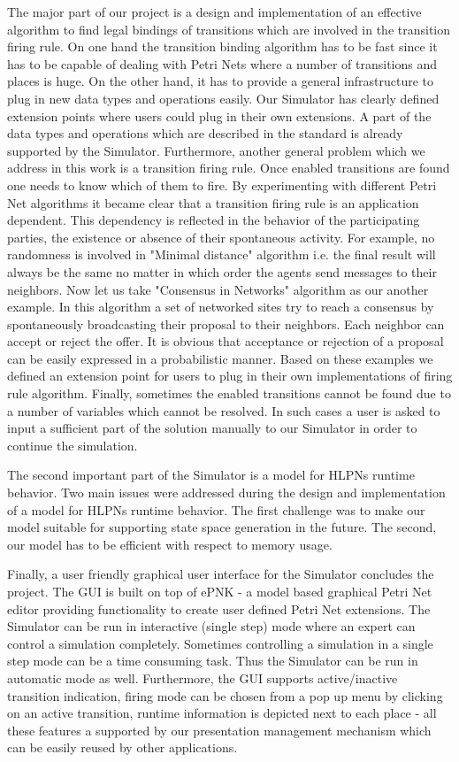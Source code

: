 The major part of our project is a design and implementation of an effective algorithm to find legal bindings of transitions which are involved in the transition firing rule. On one hand the transition binding algorithm has to be fast since it has to be capable of dealing with Petri Nets where a number of transitions and places is huge. On the other hand, it has to provide a general infrastructure to plug in new data types and operations easily. Our Simulator has clearly defined extension points where users could plug in their own extensions. A part of the data types and operations which are described in the standard is already supported by the Simulator. Furthermore, another general problem which we address in this work is a transition firing rule. Once enabled transitions are found one needs to know which of them to fire. By experimenting with different Petri Net algorithms it became clear that a transition firing rule is an application dependent. This dependency is reflected in the behavior of the participating parties, the existence or absence of their spontaneous activity. For example, no randomness is involved in "Minimal distance" algorithm \cite{min-dist} i.e. the final result will always be the same no matter in which order the agents send messages to their neighbors. Now let us take "Consensus in Networks" algorithm \cite{reisig}  as our another example. In this algorithm a set of networked sites try to reach a consensus by spontaneously broadcasting their proposal to their neighbors. Each neighbor can accept or reject the offer. It is obvious that acceptance or rejection of a proposal can be easily expressed in a probabilistic manner. Based on these examples we defined an extension point for users to plug in their own implementations of firing rule algorithm. Finally, sometimes the enabled transitions cannot be found due to a number of variables which cannot be resolved. In such cases a user is asked to input a sufficient part of the solution manually to our Simulator in order to continue the simulation.

The second important part of the Simulator is a model for HLPNs runtime behavior. Two main issues were addressed during the design and implementation of a model for HLPNs runtime behavior. The first challenge was to make our model suitable for supporting state space generation in the future. The second, our model has to be efficient with respect to memory usage.

Finally, a user friendly graphical user interface for the Simulator concludes the project. The GUI is built on top of ePNK \cite{epnk} - a model based graphical Petri Net editor providing functionality to create user defined Petri Net extensions. The Simulator can be run in interactive (single step) mode where an expert can control a simulation completely. Sometimes controlling a simulation in a single step mode can be a time consuming task. Thus the Simulator can be run in automatic mode as well. Furthermore, the GUI supports active/inactive transition indication, firing mode can be chosen from a pop up menu by clicking on an active transition, runtime information is depicted next to each place - all these features a supported by our presentation management mechanism which can be easily reused by other applications. 

